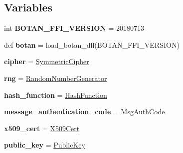 \subsection*{Variables}
\begin{DoxyCompactItemize}
\item 
\mbox{\label{namespacebotan2_a7c49966812d8deabee5d9e406b043b09}} 
int {\bfseries B\+O\+T\+A\+N\+\_\+\+F\+F\+I\+\_\+\+V\+E\+R\+S\+I\+ON} = 20180713
\item 
\mbox{\label{namespacebotan2_abccc43f4081c7549b40d9f332eac7893}} 
def {\bfseries botan} = load\+\_\+botan\+\_\+dll(B\+O\+T\+A\+N\+\_\+\+F\+F\+I\+\_\+\+V\+E\+R\+S\+I\+ON)
\item 
\mbox{\label{namespacebotan2_a72cbfa076b0bf1db0dc7f0e16196f7ed}} 
{\bfseries cipher} = \mbox{\hyperlink{classbotan2_1_1_symmetric_cipher}{Symmetric\+Cipher}}
\item 
\mbox{\label{namespacebotan2_a1722d51263c8701089d78289a580e00e}} 
{\bfseries rng} = \mbox{\hyperlink{classbotan2_1_1_random_number_generator}{Random\+Number\+Generator}}
\item 
\mbox{\label{namespacebotan2_a428480355f413caf515a94c984418ff4}} 
{\bfseries hash\+\_\+function} = \mbox{\hyperlink{classbotan2_1_1_hash_function}{Hash\+Function}}
\item 
\mbox{\label{namespacebotan2_abcba0b2891bb8c404031baf8d30ec255}} 
{\bfseries message\+\_\+authentication\+\_\+code} = \mbox{\hyperlink{classbotan2_1_1_msg_auth_code}{Msg\+Auth\+Code}}
\item 
\mbox{\label{namespacebotan2_ae746ffbe085a5b8a994f1c58793b11f3}} 
{\bfseries x509\+\_\+cert} = \mbox{\hyperlink{classbotan2_1_1_x509_cert}{X509\+Cert}}
\item 
\mbox{\label{namespacebotan2_a7d795702715788182e241d4248c80669}} 
{\bfseries public\+\_\+key} = \mbox{\hyperlink{classbotan2_1_1_public_key}{Public\+Key}}
\item 
\mbox{\label{namespacebotan2_aa5140f030b460af8fc0377174c51dc1b}} 

\end{DoxyCompactItemize}
